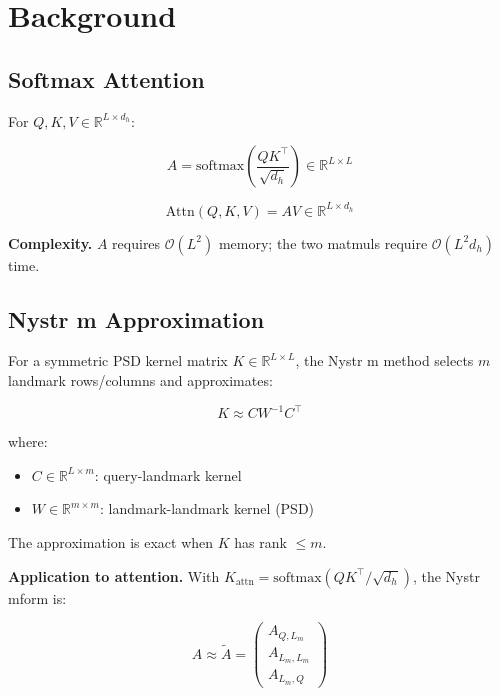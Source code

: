 
\section{Background}

\subsection{Softmax Attention}

For $Q, K, V \in \mathbb{R}^{L \times d_h}$:

\begin{equation}
A = \text{softmax}\!\left(\frac{Q K^\top}{\sqrt{d_h}}\right) \in \mathbb{R}^{L \times L}
\end{equation}

\begin{equation}
\text{Attn}(Q, K, V) = A V \in \mathbb{R}^{L \times d_h}
\end{equation}

\textbf{Complexity.} $A$ requires $\mathcal{O}(L^2)$ memory; the two matmuls 
require $\mathcal{O}(L^2 d_h)$ time.

\subsection{Nystr m Approximation}

For a symmetric PSD kernel matrix $K \in \mathbb{R}^{L \times L}$, the Nystr m 
method selects $m$ landmark rows/columns and approximates:

\begin{equation}
K \approx C W^{-1} C^\top
\end{equation}

where:

\begin{itemize}
\item $C \in \mathbb{R}^{L \times m}$: query-landmark kernel
\item $W \in \mathbb{R}^{m \times m}$: landmark-landmark kernel (PSD)

\end{itemize}
The approximation is exact when $K$ has rank $\le m$.

\textbf{Application to attention.} With $K_\text{attn} = \text{softmax}(QK^\top / \sqrt{d_h})$, 
the Nystr mform is:

\begin{equation}
A \approx \tilde{A} = \begin{pmatrix} A_{Q, L_m} \\ A_{L_m, L_m} \\ A_{L_m, Q} \end{pmatrix}
\end{equation}

